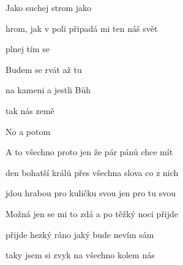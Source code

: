 

\zs
Jako  suchej strom jako 

hrom, jak v poli  připadá mi ten náš svět

plnej   tím  se 
\ks

\zr
Budem  se rvát až tu  

na kameni  a jestli  Bůh

tak nás  země 

No a potom 
\kr


\zs
A to všechno proto jen že pár pánů chce mít

den bohatší králů přes všechna slova co z nich

jdou hrabou pro kuličku svou jen pro tu svou
\ks


\zs
Možná jen se mi to zdá a po těžký noci přijde

přijde hezký ráno jaký bude nevím sám

taky jsem si zvyk na všechno kolem nás
\ks

\kp





